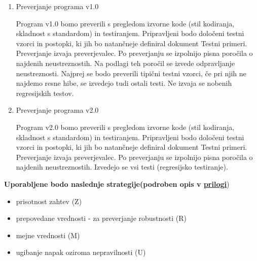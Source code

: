 \documentclass[a4paper,12pt]{article}
\begin{document}
			\begin{enumerate}[label=\alph*)]
				\item Preverjanje programa v1.0

					Program v1.0 bomo preverili s pregledom izvorne kode 
					(stil kodiranja, skladnost s standardom) in testiranjem. 
					Pripravljeni bodo določeni testni vzorci in postopki, 
					ki jih bo natančneje definiral dokument Testni primeri. 
					Preverjanje izvaja preverjevalec. Po preverjanju se izpolnijo 
					pisna poročila o najdenih neustreznostih. Na podlagi teh poročil 
					se izvede odpravljanje neustreznosti. Najprej se bodo preverili 
					tipični testni vzorci, če pri njih ne najdemo resne hibe, se 
					izvedejo tudi ostali testi. Ne izvaja se nobenih regresijskih testov.
				\item Preverjanje programa v2.0

					Program v2.0 bomo preverili s pregledom izvorne kode 
					(stil kodiranja, skladnost s standardom) in testiranjem. Pripravljeni 
					bodo določeni testni vzorci in postopki, ki jih bo natančneje definiral 
					dokument Testni primeri. Preverjanje izvaja preverjevalec. Po preverjanju 
					se izpolnijo pisna poročila o najdenih neustreznostih. Izvedejo se vsi 
					testi (regresijsko testiranje).	
			\end{enumerate}

			\textbf{Uporabljene bodo naslednje strategije(podroben opis v \hyperlink{subsection.1.9}{\ul{prilogi}}})

				\begin{itemize}
					\item prisotnost zahtev (Z)
					\item prepovedane vrednosti - za preverjanje robustnosti (R)
					\item mejne vrednosti (M)
					\item ugibanje napak oziroma nepravilnosti (U)
				\end{itemize}
\newpage
\end{document}
